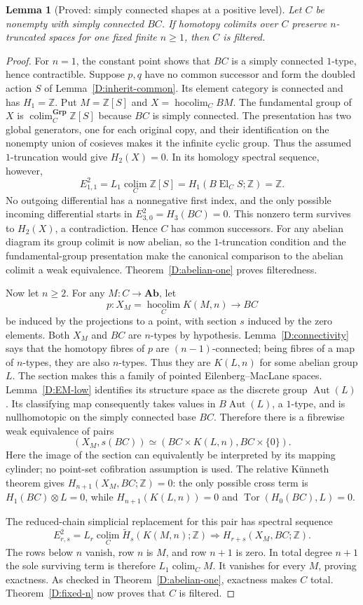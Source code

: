 \documentclass[11pt,a4paper]{article}
\newcommand{\Ab}{\mathbf{Ab}}
\newcommand{\Grp}{\mathbf{Grp}}
\newcommand{\Z}{\mathbb Z}
\newcommand{\El}{\operatorname{El}}
\newcommand{\colim}{\operatorname*{colim}}
\newcommand{\hocolim}{\operatorname*{hocolim}}
\newtheorem{lemma}[theorem]{Lemma}
\theoremstyle{definition}
\begin{document}
\begin{lemma}[Proved: simply connected shapes at a positive level]\label{D:simply-connected-shape}
Let $C$ be nonempty with simply connected $BC$. If homotopy
colimits over $C$ preserve $n$-truncated spaces for one fixed finite
$n\geq1$, then $C$ is filtered.
\end{lemma}
\begin{proof}
For $n=1$, the constant point shows that $BC$ is a simply connected
$1$-type, hence contractible. Suppose $p,q$ have no common
successor and form the doubled action $S$ of
Lemma~\ref{D:inherit-common}. Its element category is connected
and has $H_1=\Z$. Put $M=\Z[S]$ and $X=\hocolim_C BM$.
The fundamental group of $X$ is $\colim_C^{\Grp}\Z[S]$ because
$BC$ is simply connected. The presentation has two global
generators, one for each original copy, and their identification on
the nonempty union of cosieves makes it the infinite cyclic group.
Thus the assumed $1$-truncation would give $H_2(X)=0$. In its
homology spectral sequence, however,
\[
E^2_{1,1}=L_1\colim_C\Z[S]=H_1(B\El_C S;\Z)=\Z.
\]
No outgoing differential has a nonnegative first index, and the
only possible incoming differential starts in
$E^2_{3,0}=H_3(BC)=0$. This nonzero term survives to $H_2(X)$,
a contradiction. Hence $C$ has common successors. For any abelian
diagram its group colimit is now abelian, so the $1$-truncation
condition and the fundamental-group presentation make the
canonical comparison to the abelian colimit a weak equivalence.
Theorem~\ref{D:abelian-one} proves filteredness.

Now let $n\geq2$. For any $M:C\to\Ab$, let
\[
p:X_M=\hocolim_C K(M,n)\longrightarrow BC
\]
be induced by the projections to a point, with section $s$ induced
by the zero elements. Both $X_M$ and $BC$ are $n$-types by
hypothesis. Lemma~\ref{D:connectivity} says that the homotopy
fibres of $p$ are $(n-1)$-connected; being fibres of a map of
$n$-types, they are also $n$-types. Thus they are $K(L,n)$ for
some abelian group $L$. The section makes this a family of pointed
Eilenberg--MacLane spaces. Lemma~\ref{D:EM-low} identifies its
structure space as the discrete group $\operatorname{Aut}(L)$.
Its classifying map consequently takes values in
$B\operatorname{Aut}(L)$, a $1$-type, and is nullhomotopic on
the simply connected base $BC$. Therefore there is a fibrewise
weak equivalence of pairs
\[
(X_M,s(BC))\simeq(BC\times K(L,n),BC\times\{0\}).
\]
Here the image of the section can equivalently be interpreted by
its mapping cylinder; no point-set cofibration assumption is used.
The relative K\"unneth theorem gives
$H_{n+1}(X_M,BC;\Z)=0$: the only possible cross term is
$H_1(BC)\otimes L=0$, while
$H_{n+1}(K(L,n))=0$ and $\operatorname{Tor}(H_0(BC),L)=0$.

The reduced-chain simplicial replacement for this pair has
spectral sequence
\[
E^2_{r,s}=L_r\colim_C\widetilde H_s(K(M,n);\Z)
\Longrightarrow H_{r+s}(X_M,BC;\Z).
\]
The rows below $n$ vanish, row $n$ is $M$, and row $n+1$ is zero.
In total degree $n+1$ the sole surviving term is therefore
$L_1\colim_C M$. It vanishes for every $M$, proving exactness.
As checked in Theorem~\ref{D:abelian-one}, exactness makes $C$
total. Theorem~\ref{D:fixed-n} now proves that $C$ is filtered.
\end{proof}
\end{document}
